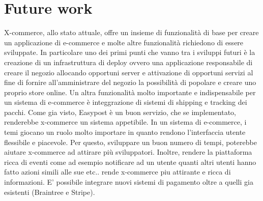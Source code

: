 \section{Future work}
\label{sec:future_work}
X-commerce, allo stato attuale, offre un insieme di funzionalità di base per creare un applicazione di e-commerce e molte altre funzionalità richiedono di essere sviluppate.
In particolare uno dei primi punti che vanno tra i sviluppi futuri è la creazione di un infrastruttura di deploy ovvero una applicazione responsabile di creare il negozio allocando opportuni server e attivazione di opportuni servizi al fine di fornire all'amministrare del negozio la possibilità di popolare e creare uno proprio store online.
Un altra funzionalità molto importante e indispensabile per un sistema di e-commerce è integgrazione di sistemi di shipping e tracking dei pacchi. Come gia visto, Easypost è un buon servizio, che se implementato, renderebbe x-commerce un sistema appetibile.
In un sistema di e-commerce, i temi giocano un ruolo molto importare in quanto rendono l'interfaccia utente flessibile e piacevole. Per questo, sviluppare un buon numero di tempi, poterebbe aiutare x-commerce ad attirare più sviluppatori.
Inoltre, rendere la piattaforma ricca di eventi come ad esempio notificare ad un utente quanti altri utenti hanno fatto azioni simili alle sue etc.. rende x-commerce piu attirante e ricca di informazioni.
E' possibile integrare nuovi sistemi di pagamento oltre a quelli gia esistenti (Braintree e Stripe).